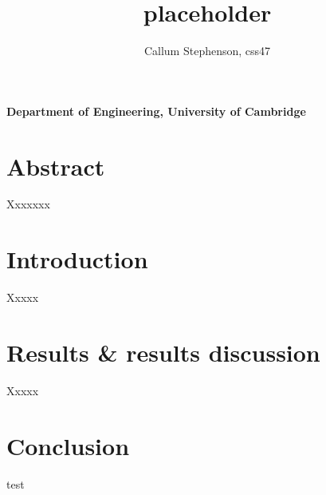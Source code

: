 \documentclass[a4,12pt]{article}
\title{\textbf{placeholder}}
\author{Callum Stephenson, css47}
\date{}
\begin{document}
    \begin{titlepage}
        \maketitle
        \thispagestyle{empty}
        \vspace{20cm}
        \textbf{Department of Engineering, University of Cambridge}
    \end{titlepage}
    \tableofcontents
    \newpage
    \section{Abstract}
    Xxxxxxx
    \section{Introduction}
    Xxxxx
    \section{Results \& results discussion}
    Xxxxx
    \section{Conclusion}
    test
    \begin{thebibliography}{99}
        
    \end{thebibliography}
\end{document}
